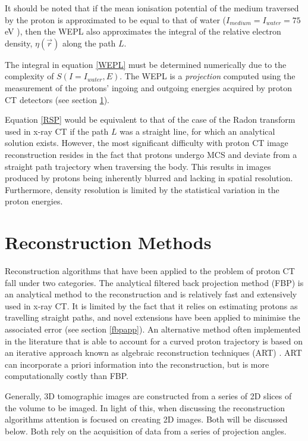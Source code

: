 \documentclass[11pt,a4paper]{article}
\begin{document}
It should be noted that if the mean ionisation potential of the medium traversed by the proton is approximated to be equal to that of water ($I_{medium} = I_{water} = 75$ eV \cite{nist}), then the WEPL also approximates the integral of the relative electron density, $\eta(\vec{r})$ along the path $L$.

The integral in equation \ref{WEPL} must be determined numerically due to the complexity of $S(I = I_{water}, E)$. The WEPL is a \textit{projection} computed using the measurement of the protons' ingoing and outgoing energies acquired by proton CT detectors (see section \ref{sec:recon}). 

Equation \ref{RSP} would be equivalent to that of the case of the Radon transform used in x-ray CT if the path $L$ was a straight line, for which an analytical solution exists. However, the most significant difficulty with proton CT image reconstruction resides in the fact that protons undergo MCS and deviate from a straight path trajectory when traversing the body. This results in images produced by protons being inherently blurred and lacking in spatial resolution. Furthermore, density resolution is limited by the statistical variation in the proton energies. 

\section{Reconstruction Methods}
\label{sec:recon}
Reconstruction algorithms that have been applied to the problem of proton CT fall under two categories. The analytical filtered back projection method (FBP) is an analytical method to the reconstruction and is relatively fast and extensively used in x-ray CT. It is limited by the fact that it relies on estimating protons as travelling straight paths, and novel extensions have been applied to minimise the associated error (see section \ref{fbpapp}). An alternative method often implemented in the literature that is able to account for a curved proton trajectory is based on an iterative approach known as algebraic reconstruction techniques (ART) \cite{avinash1988principles}. ART can incorporate a priori information into the reconstruction, but is more computationally costly than FBP. 

Generally, 3D tomographic images are constructed from a series of 2D slices of the volume to be imaged. In light of this, when discussing the reconstruction algorithms attention is focused on creating 2D images. Both will be discussed below. Both rely on the acquisition of data from a series of projection angles.
\end{document}
